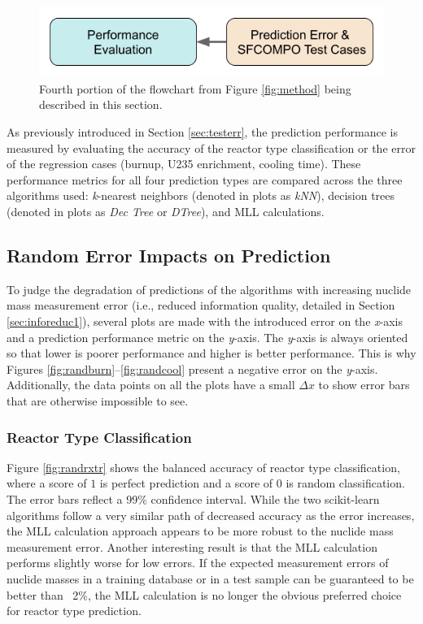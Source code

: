 
\begin{figure}[H]
  \centering
  \includegraphics[width=0.7\linewidth]{./chapters/exp1/methodology4.png}
  \caption{Fourth portion of the flowchart from Figure \ref{fig:method} being 
           described in this section.}
\end{figure}

As previously introduced in Section \ref{sec:testerr}, the prediction
performance is measured by evaluating the accuracy of the reactor type
classification or the error of the regression cases (burnup, \gls{U235}
enrichment, cooling time).  These performance metrics for all four prediction
types are compared across the three algorithms used: \textit{k}-nearest
neighbors (denoted in plots as \textit{kNN}), decision trees (denoted in plots
as \textit{Dec Tree} or \textit{DTree}), and \gls{MLL} calculations.  

\subsection{Random Error Impacts on Prediction}
\label{sec:randerr}

To judge the degradation of predictions of the algorithms with increasing
nuclide mass measurement error (i.e., reduced information quality, detailed in
Section \ref{sec:inforeduc1}), several plots are made with the introduced error
on the \textit{x}-axis and a prediction performance metric on the
\textit{y}-axis.  The \textit{y}-axis is always oriented so that lower is
poorer performance and higher is better performance. This is why Figures
\ref{fig:randburn}--\ref{fig:randcool} present a negative error on the
\textit{y}-axis. Additionally, the data points on all the plots have a small
$\Delta x$ to show error bars that are otherwise impossible to see.

\subsubsection{Reactor Type Classification}
\label{sec:randerrA}

Figure \ref{fig:randrxtr} shows the balanced accuracy of reactor type
classification, where a score of $1$ is perfect prediction and a score of $0$
is random classification. The error bars reflect a 99\% confidence interval.
While the two scikit-learn algorithms follow a very similar path of decreased
accuracy as the error increases, the \gls{MLL} calculation approach appears to
be more robust to the nuclide mass measurement error.  Another interesting
result is that the \gls{MLL} calculation performs slightly worse for low
errors. If the expected measurement errors of nuclide masses in a training
database or in a test sample can be guaranteed to be better than ~2\%, the
\gls{MLL} calculation is no longer the obvious preferred choice for reactor
type prediction.

